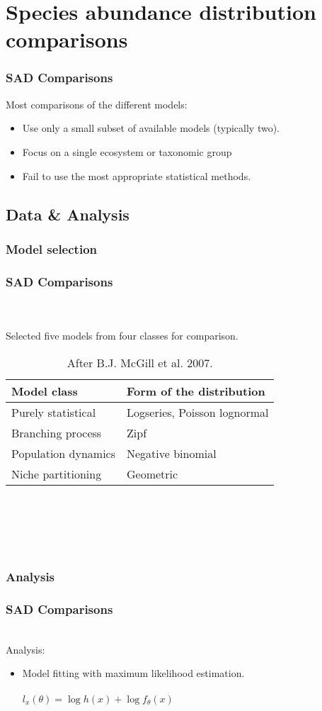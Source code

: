 \documentclass[14pt]{beamer}
\begin{document}
\section{Species abundance distribution comparisons}
\begin{frame}
\frametitle{SAD Comparisons}
\begin{large}
Most comparisons of the different models:
\end{large}
\begin{itemize}
\item Use only a small subset of available models (typically two).
\item Focus on a single ecosystem or taxonomic group
\item Fail to use the most appropriate statistical methods. 
\end{itemize}
\end{frame}

\subsection{Data & Analysis}
\subsubsection{Model selection}
\begin{frame}[shrink=10]
\frametitle{SAD Comparisons}
~\\
~\\
Selected five models from four classes for comparison.
\begin{table}
\begin{tabular}{l|l}
 Model class & Form of the distribution\\ 
\hline
 Purely statistical & Logseries, Poisson lognormal\\
 Branching process & Zipf \\
 Population dynamics & Negative binomial\\
 Niche partitioning & Geometric \\
\end{tabular}
~\\
~\\
~\\
~\\
\caption{After B.J. McGill et al. 2007.}
\end{table}
\end{frame}

\subsubsection{Analysis}
\begin{frame}[t]
\frametitle{SAD Comparisons}
~\\
Analysis:
\begin{itemize}
\item Model fitting with maximum likelihood estimation.\\
~\\
$l_x(\theta) = \log h(x) + \log f_\theta(x)$
\end{itemize}
\end{frame} 
\end{document}
